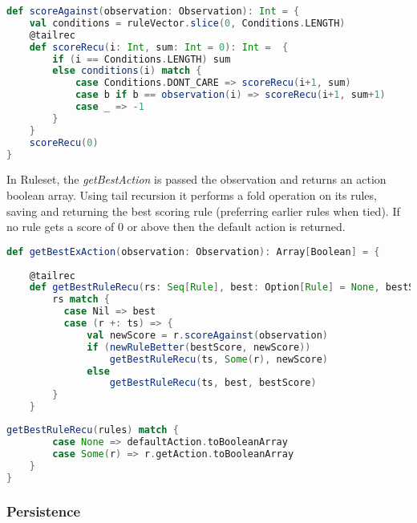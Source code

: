 \begin{minipage}{0.9\linewidth}
\centering
\begin{lstlisting}[language=scala]
def scoreAgainst(observation: Observation): Int = {
    val conditions = ruleVector.slice(0, Conditions.LENGTH)
    @tailrec
    def scoreRecu(i: Int, sum: Int = 0): Int =  {
        if (i == Conditions.LENGTH) sum
        else conditions(i) match {
            case Conditions.DONT_CARE => scoreRecu(i+1, sum)
            case b if b == observation(i) => scoreRecu(i+1, sum+1)
            case _ => -1
        }
    }
    scoreRecu(0)
}
\end{lstlisting}
\end{minipage}

In Ruleset, the \emph{getBestAction} is passed the observation and returns an action boolean array. Using tail recursion it performs a fold operation on its rules, saving and returning the best scoring rule (preferring earlier rules when tied). If no rule gets a score of 0 or above then the default action is returned.

\begin{minipage}{0.9\linewidth}
\centering
\begin{lstlisting}[language=scala]
def getBestExAction(observation: Observation): Array[Boolean] = {
    
    @tailrec
    def getBestRuleRecu(rs: Seq[Rule], best: Option[Rule] = None, bestScore: Int = 0): Option[Rule] = 
        rs match {
          case Nil => best
          case (r +: ts) => {
              val newScore = r.scoreAgainst(observation)
              if (newRuleBetter(bestScore, newScore))
                  getBestRuleRecu(ts, Some(r), newScore)
              else
                  getBestRuleRecu(ts, best, bestScore)
        }
    }
\end{lstlisting}
\end{minipage}
    
\begin{minipage}{0.9\linewidth}
\centering
\begin{lstlisting}[language=scala]
    getBestRuleRecu(rules) match {
        case None => defaultAction.toBooleanArray
        case Some(r) => r.getAction.toBooleanArray
    }
}
\end{lstlisting}
\end{minipage}


\subsubsection{Persistence}

